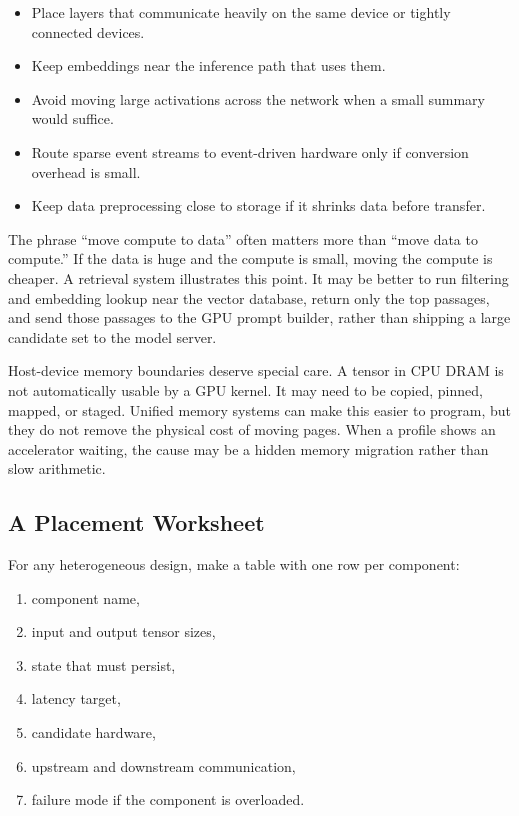 \begin{itemize}[leftmargin=*]
  \item Place layers that communicate heavily on the same device or tightly connected devices.
  \item Keep embeddings near the inference path that uses them.
  \item Avoid moving large activations across the network when a small summary would suffice.
  \item Route sparse event streams to event-driven hardware only if conversion overhead is small.
  \item Keep data preprocessing close to storage if it shrinks data before transfer.
\end{itemize}

The phrase ``move compute to data'' often matters more than ``move data to compute.'' If the data is huge and the compute is small, moving the compute is cheaper. A retrieval system illustrates this point. It may be better to run filtering and embedding lookup near the vector database, return only the top passages, and send those passages to the GPU prompt builder, rather than shipping a large candidate set to the model server.

Host-device memory boundaries deserve special care. A tensor in CPU DRAM is not automatically usable by a GPU kernel. It may need to be copied, pinned, mapped, or staged. Unified memory systems can make this easier to program, but they do not remove the physical cost of moving pages. When a profile shows an accelerator waiting, the cause may be a hidden memory migration rather than slow arithmetic.

\subsection{A Placement Worksheet}

For any heterogeneous design, make a table with one row per component:
\begin{enumerate}
  \item component name,
  \item input and output tensor sizes,
  \item state that must persist,
  \item latency target,
  \item candidate hardware,
  \item upstream and downstream communication,
  \item failure mode if the component is overloaded.
\end{enumerate}

